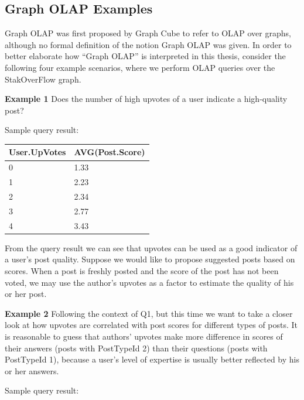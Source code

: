 \subsection{Graph OLAP Examples}
\label{OLAPExamples}
Graph OLAP was first proposed by Graph Cube \cite{sigmod11_ZhaoLXH11} to refer to OLAP over graphs, although no formal definition of the notion Graph OLAP was given. In order to better elaborate how ``Graph OLAP'' is interpreted in this thesis, consider the following four example scenarios, where we perform OLAP queries over the StakOverFlow graph.

\noindent\textbf{Example 1} Does the number of high upvotes of a user indicate a high-quality post?


Sample query result:
\begin {center}
\begin{tabular}{ l l }
	User.UpVotes&AVG(Post.Score)\\\hline
	0&1.33\\
	1&2.23\\
	2&2.34\\
	3&2.77\\
	4&3.43\\\hline
\end{tabular}
\end {center}

From the query result we can see that upvotes can be used as a good indicator of a user's post quality. Suppose we would like to propose suggested posts based on scores. When a post is freshly posted and the score of the post has not been voted, we may use the author’s upvotes as a factor to estimate the quality of his or her post.

\noindent\textbf{Example 2} Following the context of Q1, but this time we want to take a closer look at how  upvotes are correlated with post scores for different types of posts. It is reasonable to guess that authors' upvotes make more difference in scores of their answers (posts with PostTypeId 2) than their questions (posts with PostTypeId 1), because a user's level of expertise is usually better reflected by his or her answers.


Sample query result:

